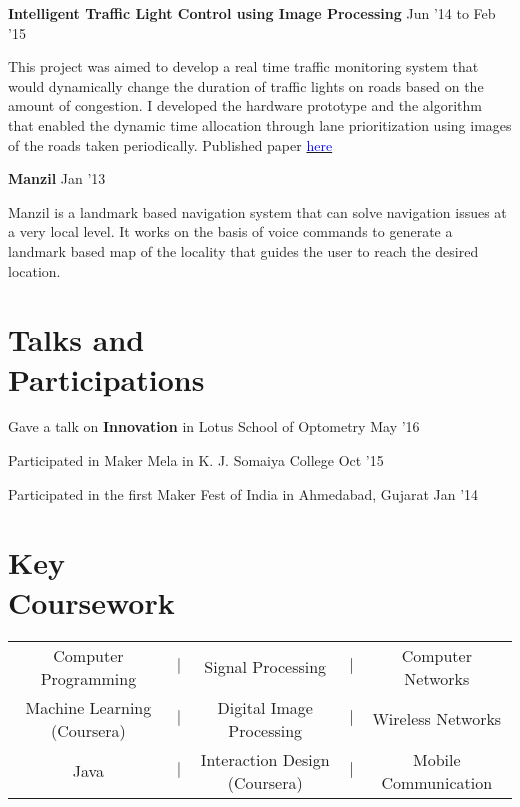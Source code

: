 \documentclass[margin,line]{res}
\newenvironment{list1}{
  \begin{list}{\ding{113}}{%
      \setlength{\itemsep}{0in}
      \setlength{\parsep}{0in} \setlength{\parskip}{0in}
      \setlength{\topsep}{0in} \setlength{\partopsep}{0in} 
      \setlength{\leftmargin}{0.17in}}}{\end{list}}
\begin{document}
\begin{resume}
\vspace*{-0.1in}

{\bf Intelligent Traffic Light Control using Image Processing} \hfill {Jun '14 to Feb '15} \\
\vspace*{-.15in}
\begin{list1}
\item[]This project was aimed to develop a real time traffic monitoring system that would dynamically change the duration of traffic lights on roads based on the amount of congestion. I developed the hardware prototype and the algorithm that enabled the dynamic time allocation through lane prioritization using images of the roads taken periodically.   
Published paper \href{http://iraj.in/up_proc/pdf/129-14265951081-3.pdf}{\textcolor{blue}{here}}
\end{list1}

\vspace*{-0.1in}

{\bf Manzil} \hfill {Jan '13} \\
\vspace*{-.15in}
\begin{list1}
\item[]
Manzil is a landmark based navigation system that can solve navigation issues at a very local level. It works on the basis of voice commands to generate a landmark based map of the locality that guides the user to reach the desired location. 
\end{list1}

\section{\sc Talks and \\ Participations}
{Gave a talk on \textbf{Innovation} in Lotus School of Optometry} \hfill {May '16}

\vspace*{-0.1in}

{Participated in Maker Mela in K. J. Somaiya College} \hfill {Oct '15}

\vspace*{-0.1in}

{Participated in the first Maker Fest of India in Ahmedabad, Gujarat} \hfill {Jan '14} 

\section{\sc Key \\Coursework} 
\begin{tabular}{ccccc}
Computer Programming & $|$ & Signal Processing & $|$ & Computer Networks \\
Machine Learning (Coursera) & $|$ & Digital Image Processing & $|$ & Wireless Networks \\
Java & $|$ & Interaction Design (Coursera) & $|$ & Mobile Communication
\end{tabular}


\end{resume}
\end{document}
